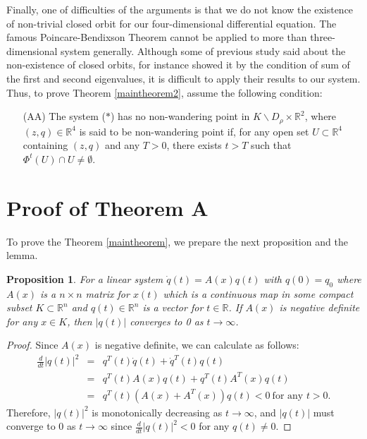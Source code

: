 \documentclass[11pt,reqno]{amsart}
\newtheorem{proposition}[theorem]{Proposition}
\begin{document}
Finally, one of difficulties of the arguments is that we do not know the existence of non-trivial closed orbit for our four-dimensional differential equation. The famous Poincare-Bendixson Theorem cannot be applied to more than three-dimensional system generally. Although some of previous study said about the non-existence of closed orbits, for instance \cite{Smith} showed it by the condition of sum of the first and second eigenvalues, it is difficult to apply their results to our system. Thus, to prove Theorem \ref{maintheorem2}, assume the following condition:
\begin{itemize}
\item[(AA)] The system ($\ast$) has no non-wandering point in $K\backslash D_\rho\times\mathbb{R}^2$, where $(z,q)\in\mathbb{R}^4$ is said to be non-wandering point if, for any open set $U\subset\mathbb{R}^4$ containing $(z,q)$ and any $T>0$, there exists $t>T$ such that $\Phi^t(U)\cap U\neq\emptyset$.
\end{itemize}





\section{Proof of Theorem A}

To prove the Theorem \ref{maintheorem}, we prepare the next proposition and the lemma.
\begin{proposition}\label{negativedef}
For a linear system $\dot{q}(t)=A(x)q(t)$ with $q(0)=q_0$ where $A(x)$ is a $n\times n$ matrix for $x(t)$ which is a continuous map in some compact subset $K\subset\mathbb{R}^n$ and $q(t)\in\mathbb{R}^n$ is a vector for $t\in\mathbb{R}$. If $A(x)$ is negative definite for any $x \in K$, then $|q(t)|$ converges to 0 as $t\to\infty$. 
\end{proposition}
\begin{proof}
Since $A(x)$ is negative definite, we can calculate as follows:
\begin{eqnarray}
\frac{d}{dt}\lvert q(t)\rvert^2&=&q^T(t)\dot{q}(t)+\dot{q}^T(t)q(t)\nonumber\\
&=& q^T(t)A(x)q(t)+q^T(t)A^T(x)q(t)\nonumber\\
&=& q^T(t)(A(x)+A^T(x))q(t)<0 \ \text{for any $t>0$}.\nonumber
\end{eqnarray}
Therefore, $\lvert q(t)\rvert^2$ is monotonically decreasing as $t\to\infty$, and $\lvert q(t)\rvert$ must converge to 0 as $t\to\infty$ since $\frac{d}{dt}\lvert q(t)\rvert^2<0$ for any $q(t)\neq 0$. 
\end{proof}
\end{document}
